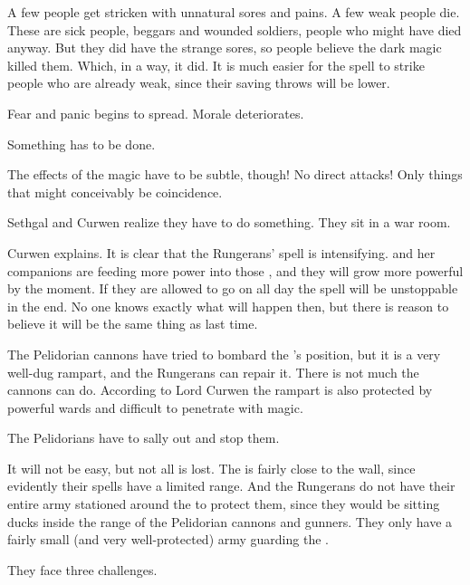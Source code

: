 A few people get stricken with unnatural sores and pains.
A few weak people die. 
These are sick people, beggars and wounded soldiers, people who might have died anyway. 
But they did have the strange sores, so people believe the dark magic killed them.
Which, in a way, it did.
It is much easier for the spell to strike people who are already weak, since their saving throws will be lower.

Fear and panic begins to spread. 
Morale deteriorates. 

Something has to be done. 

The effects of the magic have to be subtle, though!
No direct attacks!
Only things that might conceivably be coincidence. 





\begin{comment}
  \subsection{War room}
\end{comment}
\new
Sethgal and Curwen realize they have to do something. 
They sit in a war room. 

Curwen explains. 
It is clear that the Rungerans' spell is intensifying. 
\Takestsha and her companions are feeding more power into those \daemons, and they will grow more powerful by the moment. 
If they are allowed to go on all day the spell will be unstoppable in the end. 
No one knows exactly what will happen then, but there is reason to believe it will be the same thing as last time. 

The Pelidorian cannons have tried to bombard the \ishrah's position, but it is a very well-dug rampart, and the Rungerans can repair it. 
There is not much the cannons can do. 
According to Lord Curwen the rampart is also protected by powerful wards and difficult to penetrate with magic. 

The Pelidorians have to sally out and stop them. 

It will not be easy, but not all is lost. 
The \ishrah is fairly close to the wall, since evidently their spells have a limited range. 
And the Rungerans do not have their entire army stationed around the \ishrah to protect them, since they would be sitting ducks inside the range of the Pelidorian cannons and gunners. 
They only have a fairly small (and very well-protected) army guarding the \ishrah. 

They face three challenges.

